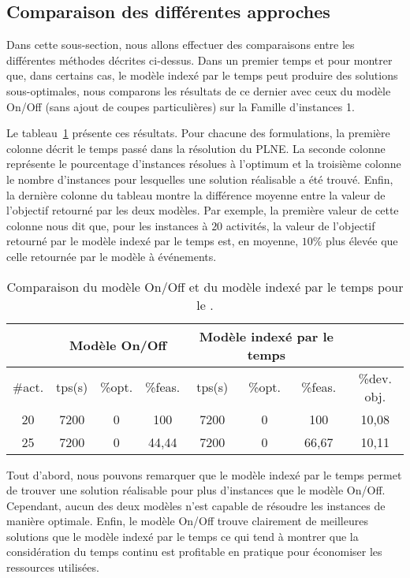 \subsection{Comparaison des différentes approches}

Dans cette sous-section, nous allons effectuer des comparaisons entre
les différentes méthodes décrites ci-dessus. Dans un premier temps et
pour montrer que, dans certains cas, le modèle indexé par le temps peut
produire des solutions sous-optimales, nous comparons les résultats de
ce dernier avec ceux du modèle On/Off (sans ajout de coupes
particulières) sur la Famille d'instances 1.   

Le tableau~\ref{CECSPMIPOBJ} présente ces résultats. Pour chacune des
formulations, la première colonne décrit le temps passé dans la
résolution du PLNE. La seconde colonne représente le pourcentage
d'instances résolues à l'optimum et la troisième colonne le nombre
d'instances pour lesquelles une solution réalisable a été
trouvé. Enfin, la dernière colonne du tableau montre la différence
moyenne entre la valeur de l'objectif retourné par les deux
modèles. Par exemple, la première valeur de cette colonne nous dit
que, pour les instances à $20$ activités, la valeur de l'objectif
retourné par le modèle indexé par le temps est, en moyenne, $10\%$
plus élevée que celle retournée par le modèle à événements. 

\begin{table}[ht] \centering
  \begin{tabular}{|c|ccc|ccc|c|}
    \hline
    & \multicolumn{3}{c|}{Modèle On/Off} &  \multicolumn{3}{c|}{Modèle
                                           indexé par le temps} &\\
    \hline
    \#act.&tps(s)&\%opt.&\%feas.&tps(s)&\%opt.
                              &\%feas.&\%dev. obj. \\
    \hline
    20 &7200 &0 &100 &7200 &0 &100 & 10,08\\
    25 &7200 &0 &44,44 &7200 &0 &66,67 & 10,11\\
    \hline
  \end{tabular}
  \caption{Comparaison du modèle On/Off et du modèle indexé par le
    temps pour le \CECSP.}
  \label{CECSPMIPOBJ}
\end{table}

Tout d'abord, nous pouvons remarquer que le modèle indexé par le temps
permet de trouver une solution réalisable pour plus d'instances que le
modèle On/Off. Cependant, aucun des deux modèles n'est capable de
résoudre les instances de manière optimale. Enfin, le modèle On/Off
trouve clairement de meilleures solutions que le modèle indexé par le
temps ce qui tend à montrer que la considération du temps continu est
profitable en pratique pour économiser les ressources utilisées.

